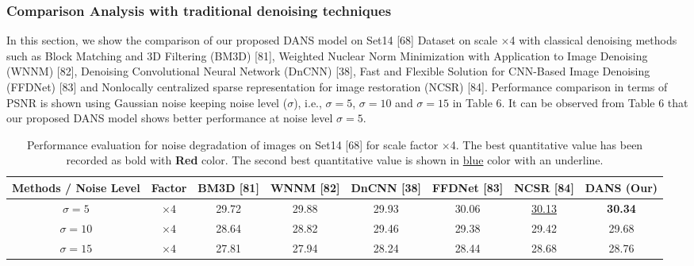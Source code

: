 \documentclass{ieeeaccess}
\begin{document}
\subsubsection{Comparison Analysis with traditional denoising techniques}

In this section, we show the comparison of our proposed DANS model on Set14 [68] Dataset on scale $\times$4 with classical denoising methods such as Block Matching and 3D Filtering (BM3D) [81], Weighted Nuclear Norm Minimization with Application to Image Denoising (WNNM) [82], Denoising Convolutional Neural Network (DnCNN) [38], Fast and Flexible Solution for CNN-Based Image Denoising (FFDNet) [83] and Nonlocally centralized sparse representation for image restoration (NCSR) [84]. Performance comparison in terms of PSNR is shown using Gaussian noise keeping noise level ($\sigma$), i.e., $\sigma = 5$, $\sigma = 10$ and $\sigma = 15$ in Table 6. It can be observed from Table 6 that our proposed DANS model shows better performance at noise level $\sigma = 5$.

\begin{table}
\centering
\caption{Performance evaluation for noise degradation of images on Set14 [68] for scale factor $\times$4. The best quantitative value has been recorded as bold with {\color{red}\textbf{Red }} color. The second best quantitative value is shown in {\color{blue}\underline{blue}} color with an underline.}

\label{table6}
\setlength{\tabcolsep}{2 pt}
\begin{tabular}{|c|c|c|c|c|c|c|c|} %
\hline
\multirow{1}{*}{Methods / Noise Level} & \multirow{1}{*}{Factor} & \multirow{1}{*}{BM3D [81]} & \multirow{1}{*}{WNNM [82]} & \multirow{1}{*}{DnCNN [38]} & \multirow{1}{*}{FFDNet [83]}  & \multirow{1}{*}{NCSR [84]} & \multirow{1}{*}{DANS (Our)}\\

\hline
$\sigma = 5$ & $\times4$  & {29.72} & {29.88} & {29.93} & {30.06} & {\color{blue}\underline{30.13}} & {\color{red}\textbf{30.34}}   \\
$\sigma = 10$ & $\times4$   & {28.64} & {28.82} & {29.46} & {29.38} & {29.42} & {29.68}   \\
$\sigma = 15$ & $\times4$  & {27.81} & {27.94} & {28.24} & {28.44} & {28.68} & {28.76}   \\
    
\hline
\end{tabular}
\end{table}
\end{document}

